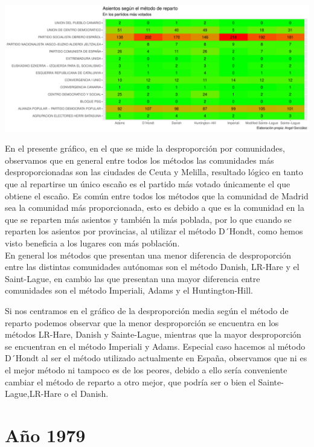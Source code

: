 \documentclass[12pt,a4paper,]{book}
\numberwithin{dummy}{section}
\theoremstyle{ocrenumbox}
\theoremstyle{blacknumex}
\theoremstyle{blacknumbox}
\theoremstyle{ocrenum}
\theoremstyle{ocrenum}
\begin{document}
\begin{center}\includegraphics[width=1\linewidth]{figurasR/unnamed-chunk-77-2} \end{center}

En el presente gráfico, en el que se mide la desproporción por
comunidades, observamos que en general entre todos los métodos las
comunidades más desproporcionadas son las ciudades de Ceuta y Melilla,
resultado lógico en tanto que al repartirse un único escaño es el
partido más votado únicamente el que obtiene el escaño. Es común entre
todos los métodos que la comunidad de Madrid sea la comunidad más
proporcionada, esto es debido a que es la comunidad en la que se
reparten más asientos y también la más poblada, por lo que cuando se
reparten los asientos por provincias, al utilizar el método D´Hondt,
como hemos visto beneficia a los lugares con más población.\\
En general los métodos que presentan una menor diferencia de
desproporción entre las distintas comunidades autónomas son el método
Danish, LR-Hare y el Saint-Lague, en cambio las que presentan una mayor
diferencia entre comunidades son el método Imperiali, Adams y el
Huntington-Hill.

Si nos centramos en el gráfico de la desproporción media según el método
de reparto podemos observar que la menor desproporción se encuentra en
los métodos LR-Hare, Danish y Sainte-Lague, mientras que la mayor
desproporción se encuentran en el método Imperiali y Adams. Especial
caso hacemos al método D´Hondt al ser el método utilizado actualmente en
España, observamos que ni es el mejor método ni tampoco es de los
peores, debido a ello sería conveniente cambiar el método de reparto a
otro mejor, que podría ser o bien el Sainte-Lague,LR-Hare o el Danish.

\hypertarget{auxf1o-1979}{%
\section{Año 1979}\label{auxf1o-1979}}
\end{document}
